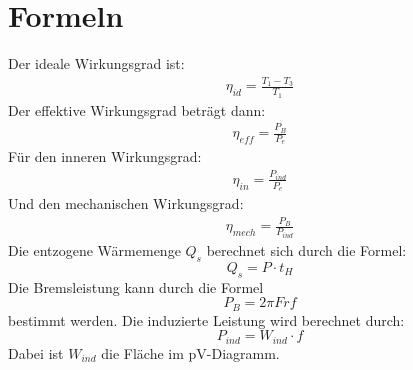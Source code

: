 \documentclass[12pt,a4paper]{scrartcl}
\begin{document}
\pagebreak

\section{Formeln}
	Der ideale Wirkungsgrad ist:
\begin{align}
        	\eta_{id} = \frac{T_1 - T_3}{T_1}
        \end{align}
	Der effektive Wirkungsgrad beträgt dann:
        \begin{align}
        	\eta_{eff} = \frac{P_B}{P_e}
        \end{align}
        Für den inneren Wirkungsgrad:
        \begin{align}
        	\eta_{in} = \frac{P_{ind}}{P_e}
        \end{align}
        Und den mechanischen Wirkungsgrad:
        \begin{align}
        	\eta_{mech} = \frac{P_B}{P_{ind}}
        \end{align}
        Die entzogene Wärmemenge $ Q_s $ berechnet sich durch die Formel:
        \begin{equation}
         Q_s = P \cdot t_H
        \end{equation}
        Die Bremsleistung kann durch die Formel
        \begin{equation}
        P_B = 2\pi  F r f
        \end{equation}
        bestimmt werden.
        Die induzierte Leistung wird berechnet durch:
        \begin{equation}
        	P_{ind} = W_{ind} \cdot f 
        \end{equation}
        Dabei ist $W_{ind}$ die Fläche im pV-Diagramm.
\pagebreak
\end{document}
